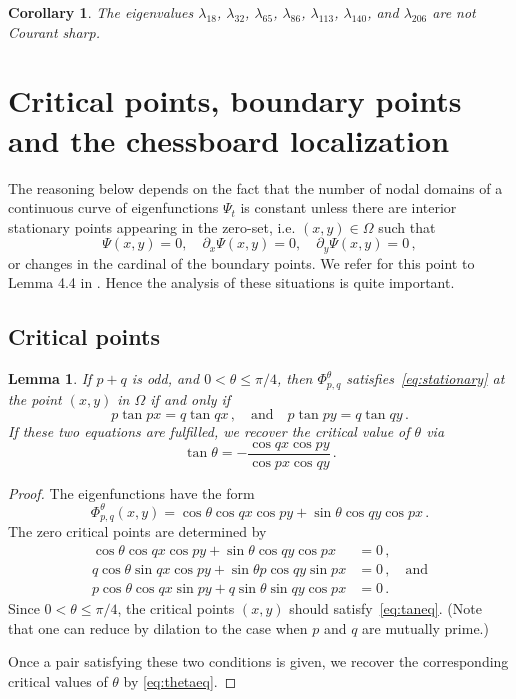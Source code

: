 \documentclass[a4paper,reqno,11pt]{amsart}
\newtheorem{lemma}[thm]{Lemma}
\newtheorem{cor}[thm]{Corollary}
\theoremstyle{remark}
\theoremstyle{definition}
\numberwithin{equation}{section}
\begin{document}
\begin{cor}
\label{cor:pp}
The eigenvalues
$\lambda_{18}$,
$\lambda_{32}$,
$\lambda_{65}$,
$\lambda_{86}$,
$\lambda_{113}$,
$\lambda_{140}$, and
$\lambda_{206}$
are not Courant sharp.
\end{cor}

\section{Critical points, boundary points and the chessboard localization}
\label{Section5}
The reasoning below depends on the fact that the number of nodal domains of a continuous curve 
of eigenfunctions $\Psi_t$ is constant unless there are interior stationary points  appearing 
in the zero-set, i.e. $(x,y)\in\Omega$ such that
\begin{equation}
\label{eq:stationary}
\Psi(x,y)=0,\quad \partial_x \Psi(x,y)=0,\quad \partial_y \Psi(x,y)=0\,,
\end{equation}
or changes in the cardinal of the boundary points. We refer for this point to Lemma 4.4 in \cite{Ley0}. 
Hence the analysis of these situations is quite important.

\subsection{Critical points}
\begin{lemma}
\label{Lemma5.1}
If $p+q$ is odd, and $0<\theta\leq\pi/4$, then $\Phi_{p,q}^{\theta}$ 
satisfies~\eqref{eq:stationary} at the point $(x,y)$ in $\Omega$ if and only if
\begin{equation}
\label{eq:taneq}
p\tan px = q\tan qx\,,\quad \text{and}\quad p\tan py=q\tan qy\,.
\end{equation}
If these two equations are fulfilled, we recover the critical
value of $\theta$ via
\begin{equation}
\label{eq:thetaeq}
\tan\theta = -\frac{\cos qx\cos py}{\cos px\cos qy}\,.
\end{equation}
\end{lemma}

\begin{proof}

The eigenfunctions have the form
\[
\Phi_{p,q}^{\theta}(x,y)
=\cos \theta \cos q x \cos p y + \sin \theta \cos qy \cos p x\,.
\]
The zero critical points are determined   by
\[
\begin{aligned}
\cos \theta \cos q x \cos p y + \sin \theta \cos qy \cos p x &=0\,,\\
q  \cos \theta  \sin qx \cos p y + \sin \theta p \cos qy \sin p x &=0\,,\quad\text{and}\\
p \cos \theta \cos qx \sin p  y + q  \sin \theta \sin q y \cos p x &=0\,.
\end{aligned}
\]
Since $0<\theta\leq \pi/4$, the critical points $(x,y)$
should satisfy~\eqref{eq:taneq}.
(Note that one can reduce by dilation to the case when $p$ and $q$ are mutually prime.) 

Once a pair satisfying these two conditions is given, we recover the corresponding critical values of $\theta$  by \eqref{eq:thetaeq}.
\end{proof}
\end{document}
